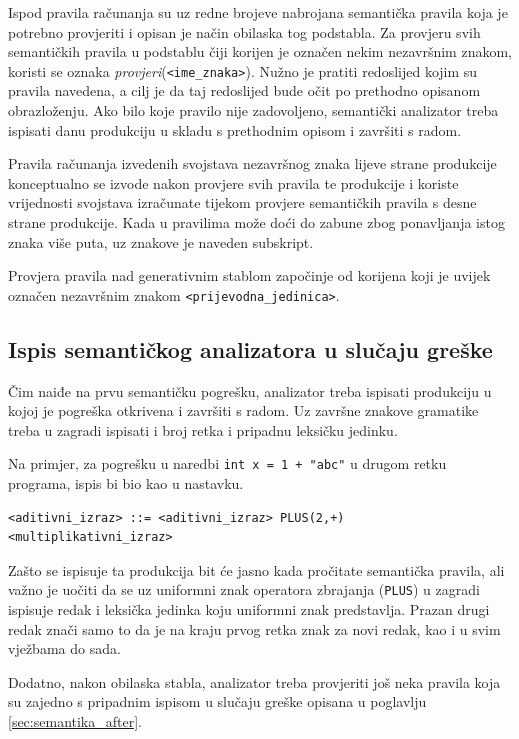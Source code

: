 \documentclass[times, 12pt, utf8]{book}
\begin{document}
Ispod pravila računanja su uz redne brojeve nabrojana semantička pravila koja je potrebno provjeriti i opisan je način obilaska tog podstabla.
Za provjeru svih semantičkih pravila u podstablu čiji korijen je označen nekim nezavršnim znakom, koristi se oznaka \emph{provjeri}(\verb|<ime_znaka>|).
Nužno je pratiti redoslijed kojim su pravila navedena, a cilj je da taj redoslijed bude očit po prethodno opisanom obrazloženju.
Ako bilo koje pravilo nije zadovoljeno, semantički analizator treba ispisati danu produkciju u skladu s prethodnim opisom i završiti s radom.

Pravila računanja izvedenih svojstava nezavršnog znaka lijeve strane produkcije konceptualno se izvode nakon provjere svih pravila te produkcije i koriste vrijednosti svojstava izračunate tijekom provjere semantičkih pravila s desne strane produkcije.
Kada u pravilima može doći do zabune zbog ponavljanja istog znaka više puta, uz znakove je naveden subskript.

Provjera pravila nad generativnim stablom započinje od korijena koji je uvijek označen nezavršnim znakom \verb|<prijevodna_jedinica>|.

\subsection{Ispis semantičkog analizatora u slučaju greške}
Čim naiđe na prvu semantičku pogrešku, analizator treba ispisati produkciju u kojoj je pogreška otkrivena i završiti s radom.
Uz završne znakove gramatike treba u zagradi ispisati i broj retka i pripadnu leksičku jedinku.

Na primjer, za pogrešku u naredbi \verb|int x = 1 + "abc"| u drugom retku programa, ispis bi bio kao u nastavku.

\begin{lstlisting}[caption={Primjer ispisa.},label=lst:semantika_ispis]
<aditivni_izraz> ::= <aditivni_izraz> PLUS(2,+) <multiplikativni_izraz>

\end{lstlisting}

Zašto se ispisuje ta produkcija bit će jasno kada pročitate semantička pravila, ali važno je uočiti da se uz uniformni znak operatora zbrajanja (\verb|PLUS|) u zagradi ispisuje redak i leksička jedinka koju uniformni znak predstavlja.
Prazan drugi redak znači samo to da je na kraju prvog retka znak za novi redak, kao i u svim vježbama do sada.

Dodatno, nakon obilaska stabla, analizator treba provjeriti još neka pravila koja su zajedno s pripadnim ispisom u slučaju greške opisana u poglavlju \ref{sec:semantika_after}.
\end{document}
